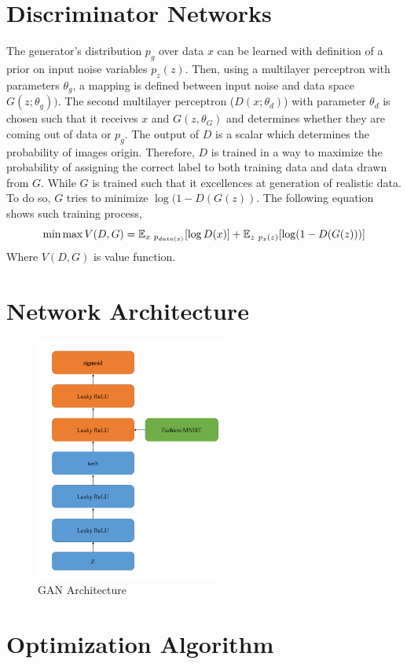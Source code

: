 \section{Discriminator Networks }
The generator’s distribution $p_g$ over data $x$ can be learned with definition of a prior on input noise variables $p_z(z)$. Then, using a multilayer perceptron with parameters $\theta_g$, a mapping is defined between input noise and data space  $G(z; \theta_g))$. The second multilayer perceptron ($D(x; \theta_d)$) with parameter $\theta_d$ is chosen such that it receives $x$ and $G(z, \theta_G)$ and determines whether they are coming out of data or $p_g$. The output of $D$ is a scalar which determines the probability of images origin. Therefore, $D$ is trained in a way to maximize the probability of assigning the correct label to both training data and data drawn from $G$. While $G$ is trained such that it excellences at generation of realistic data. To do so, $G$ tries to minimize $\log(1-D(G(z))$. The following equation shows such training process,
$$
\min \max V(D,G) = \mathbb{E}_{x ~ p_{data(x)}} [\log D(x) ] + \mathbb{E}_{z~p_z(z)}[ \log(1 - D(G(z)))]
$$
Where $V(D, G)$ is value function. 

\section{Network Architecture}
\begin{figure}[!htb]
\centering
\includegraphics[height=8cm]{gan_network.png}
\caption{GAN Architecture }
\end{figure}

\section{Optimization Algorithm}


